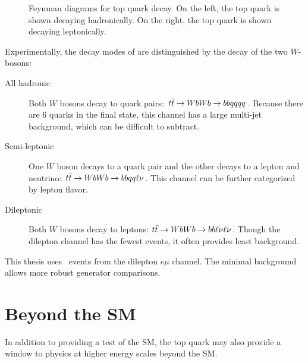 \begin{figure}[h]
\centering
{}
\caption{Feynman diagrams for top quark decay. On the left, the top quark is shown decaying hadronically. On the right, the top quark is shown decaying leptonically.}
\label{fig:tdec}
\end{figure}

Experimentally, the decay modes of \ttbar are distinguished by the decay of the two $W$-bosons:
\begin{description}
\item[All hadronic] Both $W$ bosons decay to quark pairs: $t\bar{t} \rightarrow WbWb \rightarrow bbqqqq$. Because there are 6 quarks in the final state, this channel has a large multi-jet background, which can be difficult to subtract. 

\item[Semi-leptonic] One $W$ boson decays to a quark pair and the other decays to a lepton and neutrino: $t\bar{t} \rightarrow WbWb \rightarrow bbqq \ell \nu$. This channel can be further categorized by lepton flavor.


\item[Dileptonic] Both $W$ bosons decay to leptons: $t\bar{t} \rightarrow WbWb \rightarrow bb\ell \nu\ell \nu$. Though the dilepton channel has the fewest events, it often provides least background.


\end{description} 
This thesis uses \ttbar\ events from the dilepton $e\mu$ channel. The minimal background allows more robust generator comparisons.
\section{Beyond the SM}
In addition to providing a test of the SM, the top quark may also provide a window to physics at higher energy scales beyond the SM.

